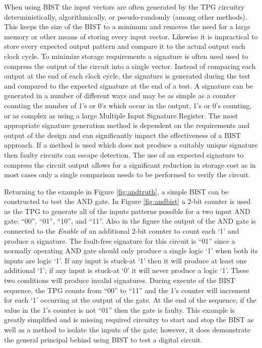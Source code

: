 \documentclass[12pt]{report}
\begin{document}
When using BIST the input vectors are often generated by the TPG circuitry deterministically, algorithmically, or pseudo-randomly (among other methods)\cite{stroud}.  This keeps the size of the BIST to a minimum and removes the need for a large memory or other means of storing every input vector.  Likewise it is impractical to store every expected output pattern and compare it to the actual output each clock cycle.  To minimize storage requirements a signature is often used used to compress the output of the circuit into a single vector.  Instead of comparing each output at the end of each clock cycle, the signature is generated during the test and compared to the expected signature at the end of a test\cite{stroud}\cite{faultdiagnosis}.  A signature can be generated in a number of different ways and may be as simple as a counter counting the number of 1's or 0's which occur in the output, 1's or 0's counting, or as complex as using a large Multiple Input Signature Register\cite{stroud}.  The most appropriate signature generation method is dependent on the requirements and output of the design and can significantly impact the effectiveness of a BIST approach.  If a method is used which does not produce a suitably unique signature then faulty circuits can escape detection\cite{stroud}\cite{faultdiagnosis}.  The use of an expected signature to compress the circuit output allows for a significant reduction in storage cost as in most cases only a single comparison needs to be performed to verify the circuit\cite{faultdiagnosis}.

Returning to the example in Figure \ref{fig:andtruth}, a simple BIST can be constructed to test the AND gate.  In Figure \ref{fig:andbist} a 2-bit counter is used as the TPG to generate all of the inputs patterns possible for a two input AND gate: ``00'', ``01'', ``10'', and ``11''.  Also in the figure the output of the AND gate is connected to the \textit{Enable} of an additional 2-bit counter to count each `1' and produce a signature.  The fault-free signature for this circuit is ``01'' since a normally operating AND gate should only produce a single logic `1' when both its inputs are logic `1'.  If any input is stuck-at `1' then it will produce at least one additional `1'; if any input is stuck-at `0' it will never produce a logic `1'.  These two conditions will produce invalid signatures.  During execute of the BIST sequence, the TPG counts from ``00'' to ``11'' and the 1's counter will increment for each `1' occurring at the output of the gate.  At the end of the sequence, if the value in the 1's counter is not ``01'' then the gate is faulty.  This example is greatly simplified and is missing required circuitry to start and stop the BIST as well as a method to isolate the inputs of the gate; however, it does demonstrate the general principal behind using BIST to test a digital circuit.
\end{document}
